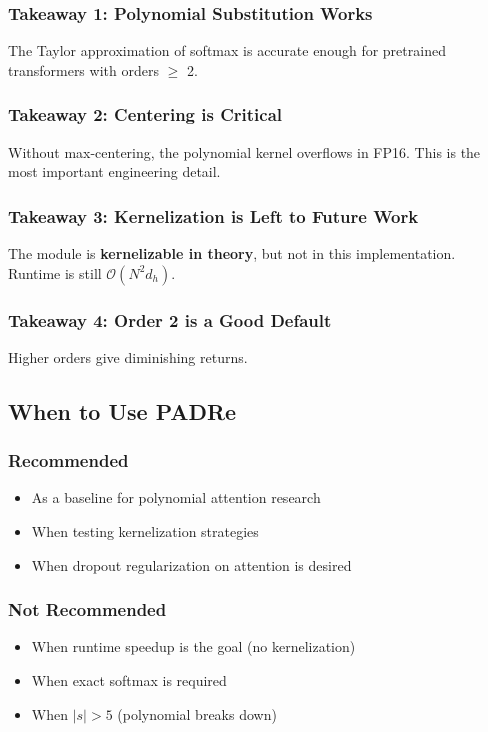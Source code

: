 \subsubsection{Takeaway 1: Polynomial Substitution Works}

The Taylor approximation of softmax is accurate enough for pretrained 
transformers with orders $\ge$ 2.

\subsubsection{Takeaway 2: Centering is Critical}

Without max-centering, the polynomial kernel overflows in FP16. This is 
the most important engineering detail.

\subsubsection{Takeaway 3: Kernelization is Left to Future Work}

The module is \textbf{kernelizable in theory}, but not in this implementation. 
Runtime is still $\mathcal{O}(N^2 d_h)$.

\subsubsection{Takeaway 4: Order 2 is a Good Default}

Higher orders give diminishing returns.

\subsection{When to Use PADRe}

\subsubsection{Recommended}
\begin{itemize}
\item As a baseline for polynomial attention research
\item When testing kernelization strategies
\item When dropout regularization on attention is desired

\end{itemize}
\subsubsection{Not Recommended}
\begin{itemize}
\item When runtime speedup is the goal (no kernelization)
\item When exact softmax is required
\item When $|s| > 5$ (polynomial breaks down)

\end{itemize}
